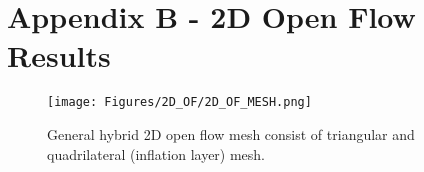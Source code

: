 \newpage
\flushleft
\section*{Appendix B - 2D Open Flow Results} 

\begin{figure}[!h]
    \centering
    \texttt{[image: Figures/2D\_OF/2D\_OF\_MESH.png]}
    \caption{General hybrid 2D open flow mesh consist of triangular and quadrilateral (inflation layer) mesh.}
    \label{fig:2D_OF_MESH}
\end{figure}